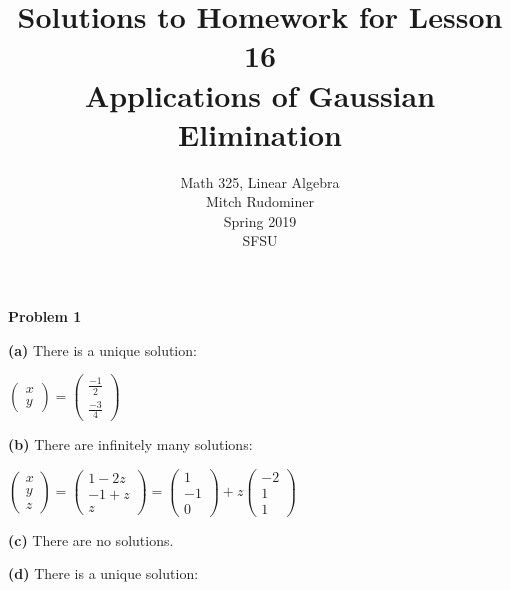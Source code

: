\documentclass[oneside,12pt]{amsart}
\begin{document}
\title{Solutions to Homework for Lesson 16 \\ Applications of Gaussian Elimination}
\author{Math 325, Linear Algebra \\ Mitch Rudominer \\ Spring 2019 \\ SFSU }
\date{}

\maketitle


\textbf{Problem 1}

\bigskip


\textbf{(a)} There is a unique solution:

\bigskip

$
\begin{pmatrix}
x \\  y
\end{pmatrix}
=
\begin{pmatrix}
\frac{-1}{2} \\[6pt]
\frac{-3}{4}
\end{pmatrix}
$


\bigskip

\textbf{(b)} There are infinitely many solutions:

\bigskip

$
\begin{pmatrix}
x \\  y \\z
\end{pmatrix}
=
\begin{pmatrix}
1-2z \\
-1+z\\
z
\end{pmatrix}
=
\begin{pmatrix}
1\\
-1 \\
0
\end{pmatrix}
+
z
\begin{pmatrix}
-2 \\
1 \\
1
\end{pmatrix}
$

\bigskip

\textbf{(c)} There are no solutions.

\bigskip

\textbf{(d)} There is a unique solution:
\end{document}
